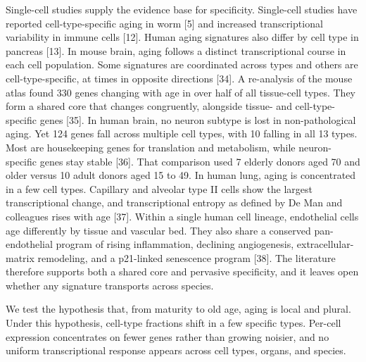 \documentclass[11pt]{article}
\begin{document}
Single-cell studies supply the evidence base for specificity. Single-cell studies have reported cell-type-specific aging in worm [5] and increased transcriptional variability in immune cells [12]. Human aging signatures also differ by cell type in pancreas [13]. In mouse brain, aging follows a distinct transcriptional course in each cell population. Some signatures are coordinated across types and others are cell-type-specific, at times in opposite directions [34]. A re-analysis of the mouse atlas found 330 genes changing with age in over half of all tissue-cell types. They form a shared core that changes congruently, alongside tissue- and cell-type-specific genes [35]. In human brain, no neuron subtype is lost in non-pathological aging. Yet 124 genes fall across multiple cell types, with 10 falling in all 13 types. Most are housekeeping genes for translation and metabolism, while neuron-specific genes stay stable [36]. That comparison used 7 elderly donors aged 70 and older versus 10 adult donors aged 15 to 49. In human lung, aging is concentrated in a few cell types. Capillary and alveolar type II cells show the largest transcriptional change, and transcriptional entropy as defined by De Man and colleagues rises with age [37]. Within a single human cell lineage, endothelial cells age differently by tissue and vascular bed. They also share a conserved pan-endothelial program of rising inflammation, declining angiogenesis, extracellular-matrix remodeling, and a p21-linked senescence program [38]. The literature therefore supports both a shared core and pervasive specificity, and it leaves open whether any signature transports across species.

We test the hypothesis that, from maturity to old age, aging is local and plural. Under this hypothesis, cell-type fractions shift in a few specific types. Per-cell expression concentrates on fewer genes rather than growing noisier, and no uniform transcriptional response appears across cell types, organs, and species.
\end{document}
